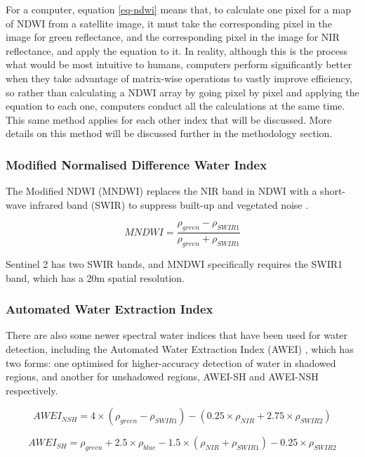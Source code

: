 For a computer, equation \ref{eq-ndwi} means that, to calculate one pixel for a map of NDWI from a satellite image, it must take the corresponding pixel in the image for green reflectance, and the corresponding pixel in the image for NIR reflectance, and apply the equation to it. In reality, although this is the process what would be most intuitive to humans, computers perform significantly better when they take advantage of matrix-wise operations to vastly improve efficiency, so rather than calculating a NDWI array by going pixel by pixel and applying the equation to each one, computers conduct all the calculations at the same time. This same method applies for each other index that will be discussed. More details on this method will be discussed further in the methodology section. 

\subsubsection{Modified Normalised Difference Water Index}
The Modified NDWI (MNDWI) replaces the NIR band in NDWI with a short-wave infrared band (SWIR) to suppress built-up and vegetated noise \citep{xu_hanqiu_2006}. 

\begin{equation} \label{eq-mndwi}
MNDWI = \frac{\rho_{green} - \rho_{SWIR1}}{\rho_{green} + \rho_{SWIR1}}
\end{equation}

Sentinel 2 has two SWIR bands, and MNDWI specifically requires the SWIR1 band, which has a 20m spatial resolution. 

\subsubsection{Automated Water Extraction Index}
There are also some newer spectral water indices that have been used for water detection, including the Automated Water Extraction Index (AWEI) \citep{feyisa_gudina_meilby_fensholt_proud_2014b}, which has two forms: one optimised for higher-accuracy detection of water in shadowed regions, and another for unshadowed regions, AWEI-SH and AWEI-NSH respectively.

\begin{equation}
AWEI_{NSH} = 4 \times (\rho_{green} - \rho_{SWIR1}) - (0.25 \times \rho_{NIR} + 2.75 \times \rho_{SWIR2})
\end{equation}

\begin{equation}
AWEI_{SH} = \rho_{green} + 2.5 \times \rho_{blue} - 1.5 \times (\rho_{NIR} + \rho_{SWIR1}) - 0.25 \times \rho_{SWIR2}
\end{equation}

